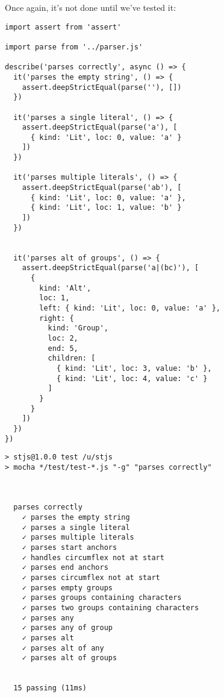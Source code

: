 \documentclass[krantzl]{krantz}
\begin{document}
Once again,
it's not done until we've tested it:


\begin{lstlisting}[frame=single,frameround=tttt]
import assert from 'assert'

import parse from '../parser.js'

describe('parses correctly', async () => {
  it('parses the empty string', () => {
    assert.deepStrictEqual(parse(''), [])
  })

  it('parses a single literal', () => {
    assert.deepStrictEqual(parse('a'), [
      { kind: 'Lit', loc: 0, value: 'a' }
    ])
  })

  it('parses multiple literals', () => {
    assert.deepStrictEqual(parse('ab'), [
      { kind: 'Lit', loc: 0, value: 'a' },
      { kind: 'Lit', loc: 1, value: 'b' }
    ])
  })


  it('parses alt of groups', () => {
    assert.deepStrictEqual(parse('a|(bc)'), [
      {
        kind: 'Alt',
        loc: 1,
        left: { kind: 'Lit', loc: 0, value: 'a' },
        right: {
          kind: 'Group',
          loc: 2,
          end: 5,
          children: [
            { kind: 'Lit', loc: 3, value: 'b' },
            { kind: 'Lit', loc: 4, value: 'c' }
          ]
        }
      }
    ])
  })
})
\end{lstlisting}



\begin{lstlisting}[frame=single,frameround=tttt]
> stjs@1.0.0 test /u/stjs
> mocha */test/test-*.js "-g" "parses correctly"



  parses correctly
    ✓ parses the empty string
    ✓ parses a single literal
    ✓ parses multiple literals
    ✓ parses start anchors
    ✓ handles circumflex not at start
    ✓ parses end anchors
    ✓ parses circumflex not at start
    ✓ parses empty groups
    ✓ parses groups containing characters
    ✓ parses two groups containing characters
    ✓ parses any
    ✓ parses any of group
    ✓ parses alt
    ✓ parses alt of any
    ✓ parses alt of groups


  15 passing (11ms)
\end{lstlisting}
\end{document}
